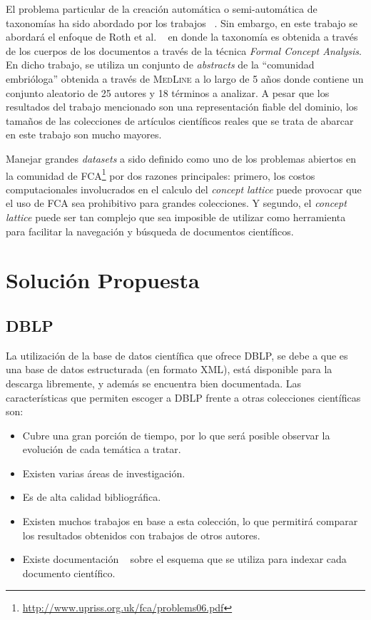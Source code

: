 \documentclass[12pt,oneside,letterpaper]{book}
\newcommand{\eng}[1]{\textit{#1}\xspace}			%
\newcommand{\abr}[1]{\textsc{#1}\xspace}           %
\theoremstyle{definition}
\begin{document}
El problema particular de la creación automática o semi-automática de taxonomías ha sido abordado por los trabajos ~\cite{cimiano2005learning,dakka2005automatic,kominek1997accessing,yeh2008ontology}. Sin embargo, en este trabajo se abordará el enfoque de Roth et al. ~\cite{roth2008towards} en donde la taxonomía es obtenida a través de los cuerpos de los documentos a través de la técnica \eng{Formal Concept Analysis}. En dicho trabajo, se utiliza un conjunto de \eng{abstracts} de la ``comunidad embrióloga'' obtenida a través de \abr{MedLine} a lo largo de 5 años donde contiene un conjunto aleatorio de 25 autores y 18 términos a analizar. A pesar que los resultados del trabajo mencionado son una representación fiable del dominio, los tamaños de las colecciones de artículos científicos reales que se trata de abarcar en este trabajo son mucho mayores.

Manejar grandes \eng{datasets} a sido definido como uno de los problemas abiertos en la comunidad de \abr{FCA}\footnote{\url{http://www.upriss.org.uk/fca/problems06.pdf}} por dos razones principales: primero, los costos computacionales involucrados en el calculo del \eng{concept lattice} puede provocar que el uso de \abr{FCA} sea prohibitivo para grandes colecciones. Y segundo, el \eng{concept lattice} puede ser tan complejo que sea imposible de utilizar como herramienta para facilitar la navegación y búsqueda de documentos científicos. 


\chapter{Solución Propuesta}
\label{chap:solution_proposal}
\section{DBLP}
\label{sec:sol_dblp}
La utilización de la base de datos científica que ofrece DBLP, se debe a que es una base de datos estructurada (en formato XML), está disponible para la descarga libremente, y además se encuentra bien documentada. Las características que permiten escoger a \abr{DBLP} frente a otras colecciones científicas son:

\begin{itemize}
	\item Cubre una gran porción de tiempo, por lo que será posible observar la evolución de cada temática a tratar.
	\item Existen varias áreas de investigación.
	\item Es de alta calidad bibliográfica.
	\item Existen muchos trabajos en base a esta colección, lo que permitirá comparar los resultados obtenidos con trabajos de otros autores.
	\item Existe documentación ~\cite{ley2009dblp} sobre el esquema que se utiliza para indexar cada documento científico.
\end{itemize}
\end{document}
